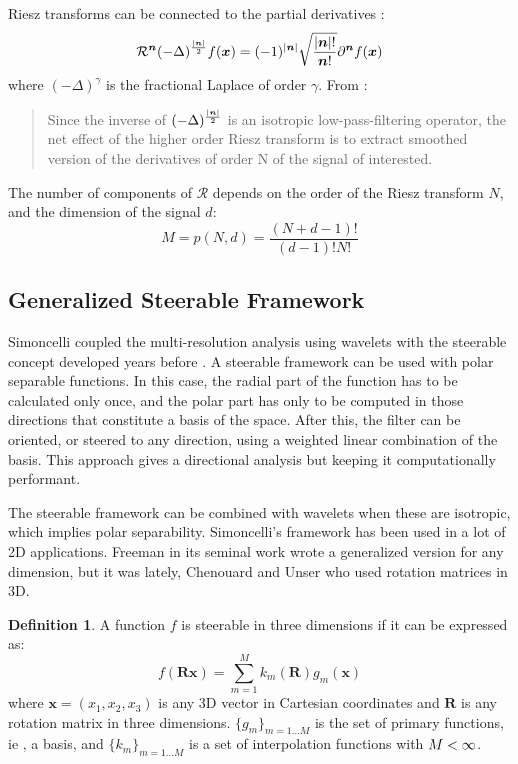 \documentclass{InsightArticle}
\theoremstyle{definition}
\newtheorem{definition}{Definition}[section]
\def\vn{\bm{n}} %
\def\vx{\bm{x}} %
\begin{document}
Riesz transforms can be connected to the partial derivatives \cite{unser_steerable_2011}:
\begin{equation*}
\label{eq:riesz_partial_derivatives}
\mathcal{R}^{\vn}(-\Delta)^{\frac{\abs{\vn}}{2}}f(\vx) = (-1)^{\abs{\vn}}\sqrt{\frac{\abs{\vn}!}{\vn!}}\partial^{\vn}f(\vx)
\end{equation*}
where $(-\Delta)^\gamma$ is the fractional Laplace of order $\gamma$. From \cite{unser_steerable_2011}: \blockquote{Since the inverse of $(-\Delta)^{\frac{\abs{\vn}}{2}}$ is an isotropic low-pass-filtering operator, the net effect of the higher order Riesz transform is to extract smoothed version of the derivatives of order N of the signal of interested.}

The number of components of $\bm{\mathcal{R}}$ depends on the order of the Riesz transform $N$, and the dimension of the signal $d$:
\begin{equation}
\label{eq:riesz_components}
 M = p(N,d) = \frac{(N+d-1)!}{(d-1)! N!}
\end{equation}

\subsection{Generalized Steerable Framework}
Simoncelli \cite{simoncelli_steerable_1995} coupled the multi-resolution analysis using wavelets with the steerable concept developed years before \cite{freeman_design_1991}. A steerable framework can be used with polar separable functions. In this case, the radial part of the function has to be calculated only once, and the polar part has only to be computed in those directions that constitute a basis of the space. After this, the filter can be oriented, or steered to any direction, using a weighted linear combination of the basis. This approach gives a directional analysis but keeping it computationally performant.

The steerable framework can be combined with wavelets when these are isotropic, which implies polar separability.
Simoncelli's framework has been used in a lot of 2D applications. Freeman in its seminal work \cite{freeman_design_1991} wrote a generalized version for any dimension, but it was lately, Chenouard and Unser \cite{held_steerable_2010,unser_steerable_2011,chenouard_3d_2012} who used rotation matrices in 3D.

\begin{definition}
A function $f$ is steerable in three dimensions if it can be expressed as:
\begin{equation}
  f(\bm{Rx}) = \sum_{m=1}^M k_m(\bm{R})g_m(\bm{x})
\end{equation}
where $\bm{x} = (x_1,x_2,x_3)$ is any 3D vector in Cartesian coordinates and $\bm{R}$ is any rotation matrix in three dimensions.
$\{g_m\}_{m=1...M}$ is the set of primary functions, ie , a basis, and $\{k_m\}_{m=1...M}$ is a set of interpolation functions with $M < \infty$.
\end{definition}
\end{document}
